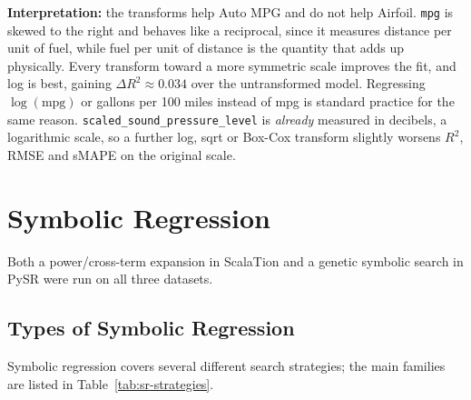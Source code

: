 \documentclass[11pt]{article}
\begin{document}
\textbf{Interpretation:} the transforms help Auto MPG and do not help
Airfoil. \texttt{mpg} is skewed to the right and behaves like a reciprocal, since it
measures distance per unit of fuel, while fuel per unit of distance is the
quantity that adds up physically. Every transform toward a more symmetric
scale improves the fit, and log is best, gaining $\Delta R^2\approx0.034$
over the untransformed model. Regressing $\log(\text{mpg})$ or gallons per
100 miles instead of mpg is standard practice for the same reason.
\texttt{scaled\_sound\_pressure\_level} is \emph{already} measured in
decibels, a logarithmic scale, so a further log, sqrt or Box-Cox transform
slightly worsens $R^2$, RMSE and sMAPE on the original scale.

\clearpage
\section{Symbolic Regression}
Both a power/cross-term expansion in ScalaTion and a genetic symbolic search
in PySR were run on all three datasets.

\subsection{Types of Symbolic Regression}
Symbolic regression covers several different search strategies; the main
families are listed in Table~\ref{tab:sr-strategies}.
\end{document}
